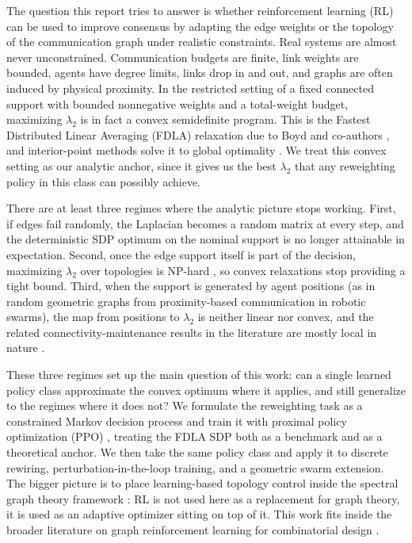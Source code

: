 \documentclass[letterpaper, 11 pt, journal, twoside]{IEEEtran}
\begin{document}
The question this report tries to answer is whether reinforcement
learning (RL) can be used to improve consensus by adapting the edge
weights or the topology of the communication graph under realistic
constraints. Real systems are almost never unconstrained.
Communication budgets are finite, link weights are bounded, agents
have degree limits, links drop in and out, and graphs are often
induced by physical proximity. In the restricted setting of a fixed
connected support with bounded nonnegative weights and a total-weight
budget, maximizing $\lambda_2$ is in fact a convex semidefinite
program. This is the Fastest Distributed Linear Averaging (FDLA)
relaxation due to Boyd and co-authors
\cite{Boyd2006,GhoshBoyd2006,XiaoBoyd2004}, and interior-point
methods solve it to global optimality
\cite{BoydVandenberghe2004}. We treat this convex setting as our
analytic anchor, since it gives us the best $\lambda_2$ that any
reweighting policy in this class can possibly achieve.

There are at least three regimes where the analytic picture stops
working. First, if edges fail randomly, the Laplacian becomes a
random matrix at every step, and the deterministic SDP optimum on
the nominal support is no longer attainable in expectation. Second,
once the edge support itself is part of the decision, maximizing
$\lambda_2$ over topologies is NP-hard \cite{Mosk2006}, so convex
relaxations stop providing a tight bound. Third, when the support is
generated by agent positions (as in random geometric graphs from
proximity-based communication in robotic swarms), the map from
positions to $\lambda_2$ is neither linear nor convex, and the
related connectivity-maintenance results in the literature are
mostly local in nature
\cite{SabattiniEtAl2013,YangFreeman2010,KimMesbahi2006}.

These three regimes set up the main question of this work: can a
single learned policy class approximate the convex optimum where it
applies, and still generalize to the regimes where it does not? We
formulate the reweighting task as a constrained Markov decision
process \cite{SuttonBarto2018} and train it with proximal policy
optimization (PPO) \cite{Schulman2017,SchulmanGAE2016}, treating the
FDLA SDP both as a benchmark and as a theoretical anchor. We then
take the same policy class and apply it to discrete rewiring,
perturbation-in-the-loop training, and a geometric swarm extension.
The bigger picture is to place learning-based topology control
inside the spectral graph theory framework
\cite{MesbahiEgerstedt2010}: RL is not used here as a replacement for
graph theory, it is used as an adaptive optimizer sitting on top of
it. This work fits inside the broader literature on graph
reinforcement learning for combinatorial design
\cite{Darvariu2024,Darvariu2021,Dai2017}.
\end{document}
